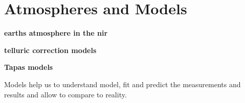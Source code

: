 
\chapter{Atmospheres and Models}


\textbf{earths atmosphere in the nir}






\textbf{telluric correction models}

\textbf{Tapas models}


Models help us to understand model, fit and predict the measurements and results and allow to compare to reality.







